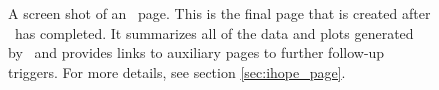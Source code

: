 \begin{figure}
\label{fig:sample_ihope_page}
\begin{center}
\end{center}
\caption{A screen shot of an \ihope~page. This is the final page that is
created after \ihope~has completed. It summarizes all of the data and plots
generated by \ihope~and provides links to auxiliary pages to further follow-up
triggers. For more details, see section \ref{sec:ihope_page}.}
\end{figure}
